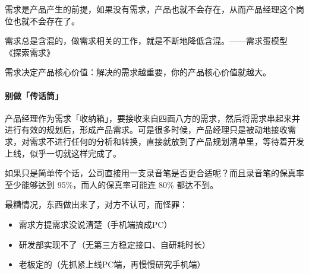 \documentclass[letterpaper,10pt,english]{sphinxmanual}
\begin{document}
需求是产品产生的前提，如果没有需求，产品也就不会存在，从而产品经理这个岗位也就不会存在了。
%
\begin{footnote}[23]\sphinxAtStartFootnote
{}
%
\end{footnote}

需求总是含混的，做需求相关的工作，就是不断地降低含混。——需求蛋模型
《探索需求》
%
\begin{footnote}[24]\sphinxAtStartFootnote
{}
%
\end{footnote}

需求决定产品核心价值：解决的需求越重要，你的产品核心价值就越大。


\paragraph{别做「传话筒」}
\label{\detokenize{chapter_introduction/need:id2}}
产品经理作为需求「收纳箱」，要接收来自四面八方的需求，然后将需求串起来并进行有效的规划后，形成产品需求。可是很多时候，产品经理只是被动地接收需求，对需求不进行任何的分析和转换，直接就放到了产品规划清单里，等待着开发上线，似乎一切就这样完成了。
%
\begin{footnote}[25]\sphinxAtStartFootnote
{}
%
\end{footnote}

如果只是简单传个话，公司直接用一支录音笔是否更合适呢？而且录音笔的保真率至少能够达到
95\%，而人的保真率可能连 80\% 都达不到。

最糟情况，东西做出来了，对方不认可，而怪罪：
\begin{itemize}
\item {} 
需求方提需求没说清楚（手机端搞成PC）

\item {} 
研发部实现不了（无第三方稳定接口、自研耗时长）

\item {} 
老板定的（先抓紧上线PC端，再慢慢研究手机端）

\end{itemize}
\end{document}

